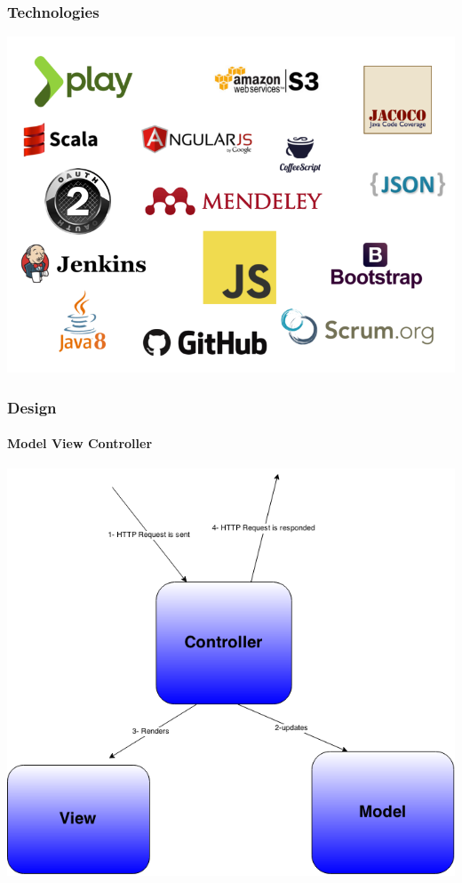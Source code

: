\documentclass{beamer}
\begin{document}
\begin{frame}
\frametitle{Technologies}
\centering
\includegraphics[scale=0.37]{./images/presentation_techlogos.png}
\end{frame}
\begin{frame}
\frametitle{Design}\framesubtitle{Model View Controller}
\centering
\includegraphics[scale=0.26]{./images/MVCdiag.png}
\end{frame}
\end{document}
